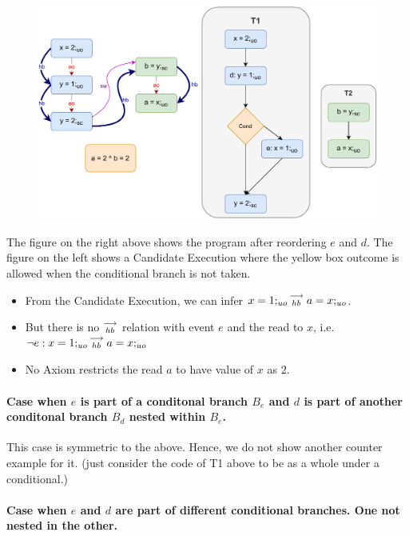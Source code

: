             \begin{figure}
                \centering 
                \includegraphics[scale=0.7]{InstructionReordering/CounterExamples2b(Conditionals).pdf}
                \caption{}
            \end{figure}
            The figure on the right above shows the program after reordering $e$ and $d$.  
            The figure on the left shows a Candidate Execution where the yellow box outcome is allowed when the conditional branch is not taken.
            \begin{itemize}
                \item From the Candidate Execution, we can infer $x=1;_{uo}\stackrel{\longrightarrow}{_{hb}}a=x;_{uo}$. 
                \item But there is no $\stackrel{\longrightarrow}{_{hb}}$ relation with event $e$ and the read to $x$, i.e. $\neg e:x=1;_{uo}\stackrel{\longrightarrow}{_{hb}}a=x;_{uo}$
                \item No Axiom restricts the read $a$ to have value of $x$ as $2$.
            \end{itemize}


        \paragraph{Case when $e$ is part of a conditonal branch $B_e$ and $d$ is part of another conditonal branch $B_d$ nested within $B_e$.}

            This case is symmetric to the above. Hence, we do not show another counter example for it. (just consider the code of T1 above to be as a whole under a conditional.)

        \paragraph{Case when $e$ and $d$ are part of different conditional branches. One not nested in the other.}


